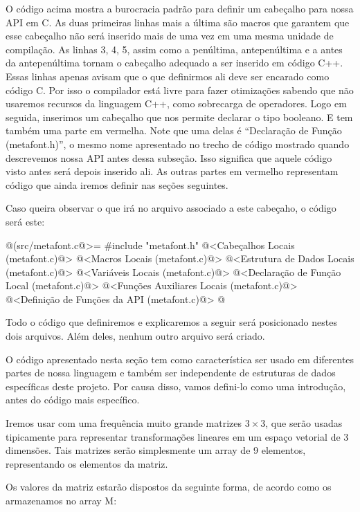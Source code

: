 O código acima mostra a burocracia padrão para definir um cabeçalho
para nossa API em C. As duas primeiras linhas mais a última são macros
que garantem que esse cabeçalho não será inserido mais de uma vez em
uma mesma unidade de compilação. As linhas 3, 4, 5, assim como a
penúltima, antepenúltima e a antes da antepenúltima tornam o cabeçalho
adequado a ser inserido em código C++. Essas linhas apenas avisam que
o que definirmos ali deve ser encarado como código C. Por isso o
compilador está livre para fazer otimizações sabendo que não usaremos
recursos da linguagem C++, como sobrecarga de operadores. Logo em
seguida, inserimos um cabeçalho que nos permite declarar o tipo
booleano. E tem também uma parte em vermelha. Note que uma delas é
``Declaração de Função (metafont.h)'', o mesmo nome apresentado no
trecho de código mostrado quando descrevemos nossa API antes dessa
subseção. Isso significa que aquele código visto antes será depois
inserido ali. As outras partes em vermelho representam código que
ainda iremos definir nas seções seguintes.

Caso queira observar o que irá no arquivo 
associado a este cabeçaho, o código será este:

\iniciocodigo
@(src/metafont.c@>=
#include "metafont.h"
@<Cabeçalhos Locais (metafont.c)@>
@<Macros Locais (metafont.c)@>
@<Estrutura de Dados Locais (metafont.c)@>
@<Variáveis Locais (metafont.c)@>
@<Declaração de Função Local (metafont.c)@>
@<Funções Auxiliares Locais (metafont.c)@>
@<Definição de Funções da API (metafont.c)@>
@
\fimcodigo

Todo o código que definiremos e explicaremos a seguir será posicionado
nestes dois arquivos. Além deles, nenhum outro arquivo será criado.


O código apresentado nesta seção tem como característica ser usado em
diferentes partes de nossa linguagem e também ser independente de
estruturas de dados específicas deste projeto. Por causa disso, vamos
defini-lo como uma introdução, antes do código mais específico.


Iremos usar com uma frequência muito grande matrizes $3\times 3$, que
serão usadas tipicamente para representar transformações lineares em
um espaço vetorial de 3 dimensões. Tais matrizes serão simplesmente um
array de 9 elementos, representando os elementos da matriz.

Os valores da matriz estarão dispostos da seguinte forma, de acordo
como os armazenamos no array M:

